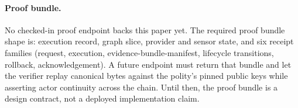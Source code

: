 \paragraph{Proof bundle.}
No checked-in proof endpoint backs this paper yet. The required proof
bundle shape is: execution record, graph slice, provider and sensor
state, and six receipt families (request, execution,
evidence-bundle-manifest, lifecycle transitions, rollback,
acknowledgement). A future endpoint
must return that bundle and let the verifier replay canonical bytes
against the polity's pinned public keys while asserting actor continuity
across the chain. Until then, the proof bundle is a design contract, not
a deployed implementation claim.
